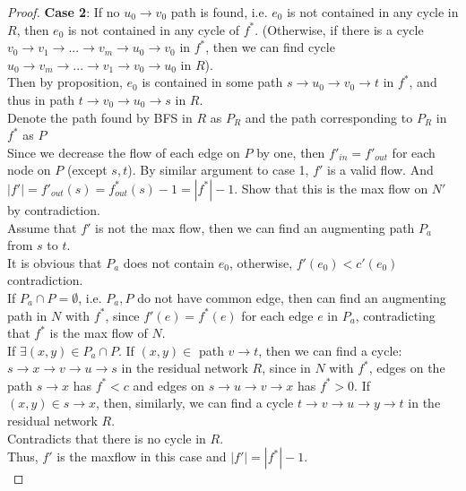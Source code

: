 \documentclass[11pt]{article}
\begin{document}
\begin{enumerate}
\begin{enumerate}
\begin{proof}
    \textbf{Case 2}: If no $u_0 \rightarrow v_0$ path is found, i.e. $e_0$ is not contained in any cycle in $R$, then $e_0$ is not contained in any cycle of $f^*$. (Otherwise, if there is a cycle $v_0 \rightarrow v_1 \rightarrow ... \rightarrow v_m \rightarrow u_0 \rightarrow v_0$ in $f^*$, then we can find cycle $u_0 \rightarrow v_m \rightarrow ... \rightarrow v_1 \rightarrow v_0 \rightarrow u_0$ in $R$).\\
    Then by proposition, $e_0$ is contained in some path $s\rightarrow u_0 \rightarrow v_0 \rightarrow t$ in $f^*$, and thus in path $t\rightarrow v_0 \rightarrow u_0 \rightarrow s$ in $R$. \\[2ex]
    Denote the path found by BFS in $R$ as $P_R$ and the path corresponding to $P_R$ in $f^*$ as $P$\\
    Since we decrease the flow of each edge on $P$ by one, then $f'_{in} = f'_{out}$ for each node on $P$ (except $s,t$). By similar argument to case 1, $f'$ is a valid flow. And $|f'| = f'_{ out}(s) = f^*_{out}(s) - 1 = |f^*| - 1$. Show that this is the max flow on $N'$ by contradiction.\\[2ex]
    Assume that $f'$ is not the max flow, then we can find an augmenting path $P_a$ from $s$ to $t$. \\
    It is obvious that $P_a$ does not contain $e_0$, otherwise, $f'(e_0) < c'(e_0)$ contradiction.\\
    If $P_a \cap P = \emptyset$, i.e. $P_a, P$ do not have common edge, then can find an augmenting path in $N$ with $f^*$, since $f'(e) = f^*(e)$ for each edge $e$ in $P_a$, contradicting that $f^*$ is the max flow of $N$.\\
    If $\exists (x, y) \in P_a \cap P$. If $(x, y) \in$ path $v\rightarrow t$, then we can find a cycle: $s \rightarrow x \rightarrow v \rightarrow u \rightarrow s$ in the residual network $R$,  since in $N$ with $f^*$, edges on the path $s\rightarrow x$ has $f^* < c$ and edges on $s \rightarrow u \rightarrow v \rightarrow x$ has $f^* > 0$.  If $(x, y) \in s\rightarrow x$, then, similarly,  we can find a cycle  $t \rightarrow v \rightarrow u \rightarrow y \rightarrow t$ in the residual network $R$.\\
    Contradicts that there is no cycle in $R$.\\
    Thus, $f'$ is the maxflow in this case and $|f'| = |f^*| - 1$.\\
    \end{proof}
    

\end{enumerate}
\end{enumerate}
\end{document}
